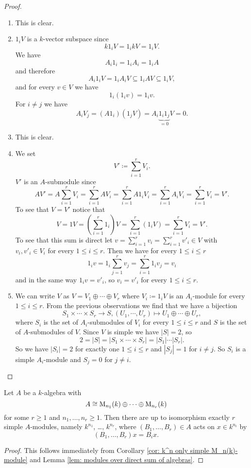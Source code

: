 \begin{proof}
 \begin{enumerate}[label=\emph{\alph*}),leftmargin=*]
  \item
   This is clear.
  \item
   $1_i V$ is a $k$-vector subspace since
   \[
    k 1_i V = 1_i k V = 1_i V.
   \]
   We have
   \[
    A_i 1_i = 1_i A_i = 1_i A
   \]
   and therefore
   \[
    A_i 1_i V = 1_i A_i V \subseteq 1_i A V \subseteq 1_i V,
   \]
   and for every $v \in V$ we have
   \[
    1_i (1_i v) = 1_i v.
   \]
   For $i \neq j$ we have
   \[
    A_i V_j = (A 1_i) (1_j V) = A_i \underbrace{1_i 1_j}_{=0} V = 0.
   \]
  \item
   This is clear.
  \item
   We set
   \[
    V' \coloneqq \sum_{i=1}^r V_i.
   \]
   $V'$ is an $A$-submodule since
   \[
    A V'
    = A \sum_{i=1}^r V_i
    = \sum_{i=1}^r A V_i
    = \sum_{i=1}^r A 1_i V_i
    = \sum_{i=1}^r A_i V_i
    = \sum_{i=1}^r V_i
    = V'.
   \]
   To see that $V = V'$ notice that
   \[
    V = 1 V = \left( \sum_{i=1}^r 1_i \right) V = \sum_{i=1}^r (1_i V) = \sum_{i=1}^r V_i = V'.
   \]
   To see that this sum is direct let $v = \sum_{i=1}^r v_i = \sum_{i=1}^r v'_i \in V$ with $v_i, v'_i \in V_i$ for every $1 \leq i \leq r$. Then we have for every $1 \leq i \leq r$
   \[
    1_i v = 1_i \sum_{j=1}^r v_j = \sum_{i=1}^r 1_i v_j = v_i
   \]
   and in the same way $1_i v = v'_i$, so $v_i = v'_i$ for every $1 \leq i \leq r$.
  \item
   We can write $V$ as $V = V_1 \oplus \dotsb \oplus V_r$ where $V_i \coloneqq 1_i V$ is an $A_i$-module for every $1 \leq i \leq r$. From the previous observations we find that we have a bijection
   \[
    S_1 \times \dotsb \times S_r \to S, (U_1, \dotsb, U_r) \mapsto U_1 \oplus \dotsb \oplus U_r,
   \]
   where $S_i$ is the set of $A_i$-submodules of $V_i$ for every $1 \leq i \leq r$ and $S$ is the set of $A$-submodules of $V$. Since $V$ is simple we have $|S| = 2$, so
   \[
    2 = |S| = |S_1 \times \dotsb \times S_r| = |S_1| \dotsm |S_r|.
   \]
   So we have $|S_i| = 2$ for exactly one $1 \leq i \leq r$ and $|S_j| = 1$ for $i \neq j$. So $S_i$ is a simple $A_i$-module and $S_j = 0$ for $j \neq i$.
  \qedhere
 \end{enumerate}
\end{proof}


\begin{cor}\label{cor: simple modules over product of matrix algebras}
 Let $A$ be a $k$-algebra with
 \[
  A \cong \operatorname{M}_{n_1}(k) \oplus \dotsb \oplus \operatorname{M}_{n_r}(k)
 \]
 for some $r \geq 1$ and $n_1, \dotsc, n_r \geq 1$. Then there are up to isomorphism exactly $r$ simple $A$-modules, namely $k^{n_1}$, \dots, $k^{n_r}$, where $(B_1, \dotsc, B_r) \in A$ acts on $x \in k^{n_i}$ by
 \[
  (B_1, \dotsc, B_r) x =  B_i x.
 \]
\end{cor}
\begin{proof}
 This follows immediately from Corollary \ref{cor: k^n only simple M_n(k)-module} and Lemma \ref{lem: modules over direct sum of algebras}.
\end{proof}


